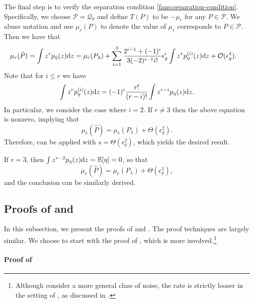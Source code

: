 \documentclass{article}
\def\eps{{\epsilon}}
\def\gO{{\mathcal{O}}}
\def\gP{{\mathcal{P}}}
\def\gQ{{\mathcal{Q}}}
\newcommand{\E}{\mathbb{E}}
\newcommand{\dd}{\textup{d}}
\begin{document}
The final step is to verify the separation condition  \eqref{fano:separation-condition}. Specifically, we choose $\gP=\gQ_0$ and define $T(P)$ to be $-\mu_r$ for any $P\in\gP$. We abuse notation and use $\mu_r(P)$ to denote the value of $\mu_r$ corresponds to $P\in\gP$. Then we have that
\begin{equation}
    \notag
    \begin{aligned}
        \mu_r(\hat{P}) &= \int z^r p_{\hat{\eta}}(z) \dd z = \mu_r(P_{\lambda}) + \sum_{i=1}^{3} \frac{2^{i-1}+(-1)^i}{3(-2)^{i-1}i!} \eps_g^i  \int z^r p_{\eta}^{(i)}(z) \dd z + \gO(\eps_g^4).
    \end{aligned}
\end{equation}
Note that for $i\leq r$ we have
\begin{equation}
    \notag
    \int z^r p_{\eta}^{(i)}(z)\dd z = (-1)^i \frac{r!}{(r-i)!} \int z^{r-i}p_{\eta}(z) \dd z.
\end{equation}
In particular, we consider the case where $i=2$. If $r\neq 3$ then the above equation is nonzero, implying that
$$\mu_r(\hat{P})=\mu_r(P_{\lambda})+\Theta(\eps_g^2).$$
Therefore,  can be applied with $s=\Theta(\eps_g^2)$, which yields the desired result.

If $r=3$, then $\int z^{r-2}p_{\eta}(z)\dd z = \E[\eta]=0$, so that
$$\mu_r(\hat{P})=\mu_r(P_{\lambda})+\Theta(\eps_g^3),$$
and the conclusion can be similarly derived.


\subsection{Proofs of  and }
\label{subsec:proof-estimating-cumulants} 

In this subsection, we present the proofs of  and . The proof techniques are largely similar. We choose to start with the proof of , which is more involved.\footnote{Although  consider a more general class of noise, the rate is strictly looser in the setting of , as discussed in .}

\paragraph{Proof of }
\end{document}
